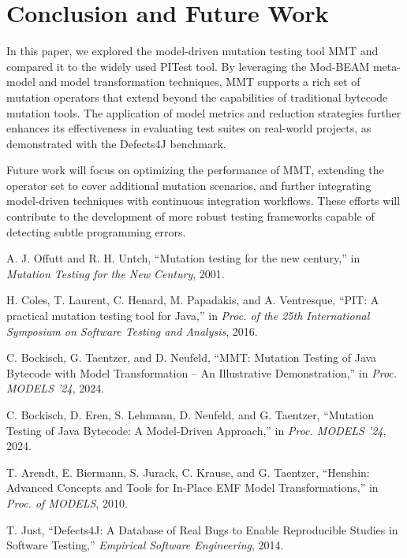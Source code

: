\documentclass[sigplan, nonacm]{acmart}
\begin{document}
\section{Conclusion and Future Work}
\label{sec:conclusion}
In this paper, we explored the model-driven mutation testing tool MMT and compared it to the widely used PITest tool. By leveraging the Mod-BEAM meta-model and model transformation techniques, MMT supports a rich set of mutation operators that extend beyond the capabilities of traditional bytecode mutation tools. The application of model metrics and reduction strategies further enhances its effectiveness in evaluating test suites on real-world projects, as demonstrated with the Defects4J benchmark.

Future work will focus on optimizing the performance of MMT, extending the operator set to cover additional mutation scenarios, and further integrating model-driven techniques with continuous integration workflows. These efforts will contribute to the development of more robust testing frameworks capable of detecting subtle programming errors.

\begin{thebibliography}{9}
A. J. Offutt and R. H. Untch, ``Mutation testing for the new century,'' in \textit{Mutation Testing for the New Century}, 2001.

H. Coles, T. Laurent, C. Henard, M. Papadakis, and A. Ventresque, ``PIT: A practical mutation testing tool for Java,'' in \textit{Proc. of the 25th International Symposium on Software Testing and Analysis}, 2016.

C. Bockisch, G. Taentzer, and D. Neufeld, ``MMT: Mutation Testing of Java Bytecode with Model Transformation -- An Illustrative Demonstration,'' in \textit{Proc. MODELS '24}, 2024.

C. Bockisch, D. Eren, S. Lehmann, D. Neufeld, and G. Taentzer, ``Mutation Testing of Java Bytecode: A Model-Driven Approach,'' in \textit{Proc. MODELS '24}, 2024.

T. Arendt, E. Biermann, S. Jurack, C. Krause, and G. Taentzer, ``Henshin: Advanced Concepts and Tools for In-Place EMF Model Transformations,'' in \textit{Proc. of MODELS}, 2010.

T. Just, ``Defects4J: A Database of Real Bugs to Enable Reproducible Studies in Software Testing,'' \textit{Empirical Software Engineering}, 2014.

\end{thebibliography}
\end{document}
